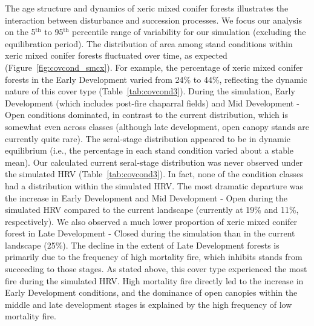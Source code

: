 The age structure and dynamics of xeric mixed conifer forests illustrates the interaction between disturbance and succession processes. We focus our analysis on the 5$^{\text{th}}$ to 95$^{\text{th}}$ percentile range of variability for our simulation (excluding the equilibration period). %
%
The distribution of area among stand conditions within xeric mixed conifer forests fluctuated over time, as expected (Figure~\ref{fig:covcond_smcx}). For example, the percentage of xeric mixed conifer forests in the Early Development varied from 24\% to 44\%, reflecting the dynamic nature of this cover type (Table~\ref{tab:covcond3}). During the simulation, Early Development (which includes post-fire chaparral fields) and Mid Development - Open conditions dominated, in contrast to the current distribution, which is somewhat even across classes (although late development, open canopy stands are currently quite rare).  %
%
The seral-stage distribution appeared to be in dynamic equilibrium (i.e., the percentage in each stand condition varied about a stable mean). Our calculated current seral-stage distribution was never observed under the simulated HRV (Table~\ref{tab:covcond3}). In fact, none of the condition classes had a distribution within the simulated HRV. The most dramatic departure was the increase in Early Development and Mid Development - Open during the simulated HRV compared to the current landscape (currently at 19\% and 11\%, respectively). We also observed a much lower proportion of xeric mixed conifer forest in Late Development - Closed during the simulation than in the current landscape (25\%). The decline in the extent of Late Development forests is primarily due to the frequency of high mortality fire, which inhibits stands from succeeding to those stages. As stated above, this cover type experienced the most fire during the simulated HRV. High mortality fire directly led to the increase in Early Development conditions, and the dominance of open canopies within the middle and late development stages is explained by the high frequency of low mortality fire.

